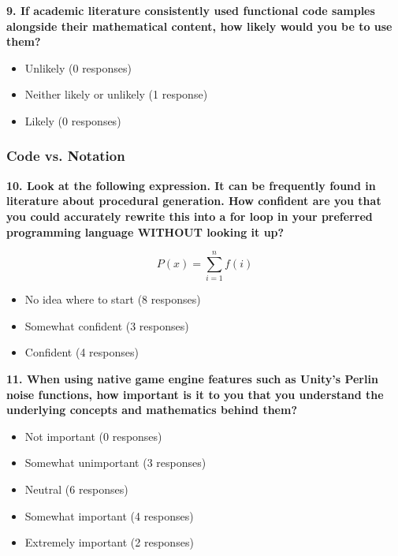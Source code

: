 \vspace{2em}

\textbf{9. If academic literature consistently used functional code samples alongside their mathematical content, how likely would you be to use them?}

\begin{itemize}
    \item Unlikely (0 responses)
    \item Neither likely or unlikely (1 response)
    \item Likely (0 responses)
\end{itemize}


\subsubsection{Code vs. Notation}

\textbf{10. Look at the following expression. It can be frequently found in literature about procedural generation. How confident are you that you could accurately rewrite this into a for loop in your preferred programming language WITHOUT looking it up?}

$$P(x) = \sum_{i=1}^{n} f(i)$$

\begin{itemize}
    \item No idea where to start (8 responses)
    \item Somewhat confident (3 responses)
    \item Confident (4 responses)
\end{itemize}

\vspace{2em}

\textbf{11. When using native game engine features such as Unity's Perlin noise functions, how important is it to you that you understand the underlying concepts and mathematics behind them?}

\begin{itemize}
    \item Not important (0 responses)
    \item Somewhat unimportant (3 responses)
    \item Neutral (6 responses)
    \item Somewhat important (4 responses)
    \item Extremely important (2 responses)
\end{itemize}

\vspace{2em}

